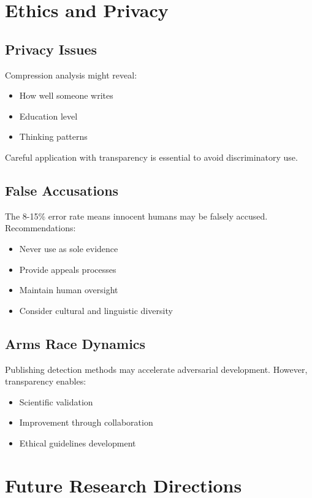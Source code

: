 \documentclass[12pt,a4paper]{report}
\begin{document}
\section{Ethics and Privacy}

\subsection{Privacy Issues}

Compression analysis might reveal:
\begin{itemize}
    \item How well someone writes
    \item Education level
    \item Thinking patterns
\end{itemize}

Careful application with transparency is essential to avoid discriminatory use.

\subsection{False Accusations}

The 8-15\% error rate means innocent humans may be falsely accused. Recommendations:
\begin{itemize}
    \item Never use as sole evidence
    \item Provide appeals processes
    \item Maintain human oversight
    \item Consider cultural and linguistic diversity
\end{itemize}

\subsection{Arms Race Dynamics}

Publishing detection methods may accelerate adversarial development. However, transparency enables:
\begin{itemize}
    \item Scientific validation
    \item Improvement through collaboration
    \item Ethical guidelines development
\end{itemize}

\section{Future Research Directions}
\end{document}
